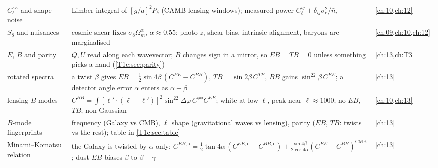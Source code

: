 \begin{center}
\begin{tabularx}{\linewidth}{@{}>{\raggedright\arraybackslash}p{3.3cm}
                               >{\raggedright\arraybackslash}X
                               >{\raggedright\arraybackslash}p{2.4cm}@{}}
$C_\ell^{\kappa\kappa}$ and shape noise & Limber integral of $[g/a]^2P_\delta$ (CAMB lensing windows); measured power $C_\ell^{ij}+\delta_{ij}\sigma_e^2/\bar n_i$ & \cref{ch:10,ch:12}\\
$S_8$ and nuisances & cosmic shear fixes $\sigma_8\Omega_m^{\alpha}$, $\alpha\approx0.55$; photo-$z$, shear bias, intrinsic alignment, baryons are marginalised & \cref{ch:09,ch:10,ch:12}\\
$E$, $B$ and parity & $Q,U$ read along each wavevector; $B$ changes sign in a mirror, so $EB=TB=0$ unless something picks a hand (\cref{T1c:sec:parity}) & \cref{ch:13,ch:T3}\\
rotated spectra & a twist $\beta$ gives $EB=\frac12\sin4\beta\,(C^{EE}-C^{BB})$, $TB=\sin2\beta\,C^{TE}$, $BB$ gains $\sin^22\beta\,C^{EE}$; a detector angle error $\alpha$ enters as $\alpha+\beta$ & \cref{ch:13}\\
lensing $B$ modes & $C^{BB}=\int[\bm\ell'\cdot(\bm\ell-\bm\ell')]^2\sin^22\Delta\varphi\,C^{\phi\phi}C^{EE}$; white at low $\ell$, peak near $\ell\approx1000$; no $EB$, $TB$; non-Gaussian & \cref{ch:10,ch:13}\\
$B$-mode fingerprints & frequency (Galaxy vs CMB), $\ell$ shape (gravitational waves vs lensing), parity ($EB$, $TB$: twists vs the rest); table in \cref{T1c:sec:table} & \cref{ch:13}\\
Minami--Komatsu relation & the Galaxy is twisted by $\alpha$ only: $C^{EB,\mathrm o}=\frac12\tan4\alpha\,(C^{EE,\mathrm o}-C^{BB,\mathrm o})+\frac{\sin4\beta}{2\cos4\alpha}(C^{EE}-C^{BB})^{\mathrm{CMB}}$; dust $EB$ biases $\beta$ to $\beta-\gamma$ & \cref{ch:13}\\
\bottomrule
\end{tabularx}
\end{center}

